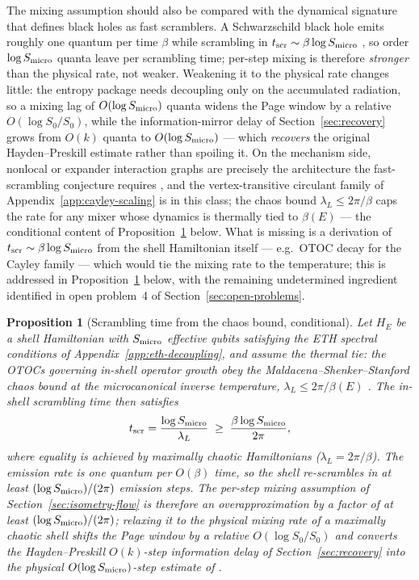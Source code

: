 \documentclass[12pt]{article}
\newcommand{\Smicro}{S_{\rm micro}}
\newtheorem{proposition}{Proposition}
\begin{document}
The mixing assumption should also be compared with the dynamical signature
that defines black holes as fast scramblers.  A Schwarzschild black hole
emits roughly one quantum per time $\beta$ while scrambling in
$t_{\rm scr}\sim\beta\log\Smicro$ \cite{SekinoSusskind2008}, so order
$\log\Smicro$ quanta leave per scrambling time; per-step mixing is therefore
\emph{stronger} than the physical rate, not weaker.  Weakening it to the
physical rate changes little: the entropy package needs decoupling only on
the accumulated radiation, so a mixing lag of $O(\log\Smicro)$ quanta widens
the Page window by a relative $O(\log S_0/S_0)$, while the information-mirror
delay of Section~\ref{sec:recovery} grows from $O(k)$ quanta to
$O(\log\Smicro)$ --- which \emph{recovers} the original Hayden--Preskill
estimate rather than spoiling it.  On the mechanism side, nonlocal or
expander interaction graphs are precisely the architecture the fast-scrambling
conjecture requires \cite{LashkariStanfordHastingsHaydenOsborne2013}, and the
vertex-transitive circulant family of Appendix~\ref{app:cayley-scaling} is in
this class; the chaos bound $\lambda_L\le2\pi/\beta$
\cite{MaldacenaShenkerStanford2016} caps the rate for any mixer whose
dynamics is thermally tied to $\beta(E)$ --- the conditional content of
Proposition~\ref{prop:scrambling-time} below.  What is missing is a derivation of
$t_{\rm scr}\sim\beta\log\Smicro$ from the shell Hamiltonian itself ---
e.g.\ OTOC decay for the Cayley family --- which would tie the mixing rate to
the temperature; this is addressed in
Proposition~\ref{prop:scrambling-time} below, with the remaining
undetermined ingredient identified in open problem~4 of
Section~\ref{sec:open-problems}.

\begin{proposition}[Scrambling time from the chaos bound, conditional]
\label{prop:scrambling-time}
Let $H_E$ be a shell Hamiltonian with $\Smicro$ effective qubits satisfying
the ETH spectral conditions of Appendix~\ref{app:eth-decoupling}, and assume
the \emph{thermal tie}: the OTOCs governing in-shell operator growth obey
the Maldacena--Shenker--Stanford chaos bound at the microcanonical inverse
temperature, $\lambda_L\le2\pi/\beta(E)$
\cite{MaldacenaShenkerStanford2016}.  The
in-shell scrambling time then satisfies
\begin{equation}
  \label{eq:scrambling-time}
  t_{\rm scr} = \frac{\log\Smicro}{\lambda_L}
  \;\geq\; \frac{\beta\log\Smicro}{2\pi},
\end{equation}
where equality is achieved by maximally chaotic Hamiltonians
($\lambda_L=2\pi/\beta$).  The emission
rate is one quantum per $O(\beta)$ time, so the shell re-scrambles in
at least $(\log\Smicro)/(2\pi)$ emission steps.  The per-step mixing assumption of
Section~\ref{sec:isometry-flow} is therefore an overapproximation by a
factor of at least $(\log\Smicro)/(2\pi)$; relaxing it to the physical
mixing rate of a maximally chaotic shell
shifts the Page window by a relative $O(\log S_0/S_0)$ and converts the
Hayden--Preskill $O(k)$-step information delay of
Section~\ref{sec:recovery} into the physical $O(\log\Smicro)$-step
estimate of \cite{HaydenPreskill2007}.
\end{proposition}
\end{document}
